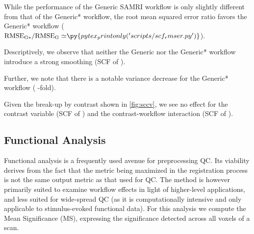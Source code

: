 While the performance of the Generic SAMRI workflow is only slightly different from that of the Generic* workflow, the root mean squared error ratio favors the Generic* workflow ($\mathrm{RMSE_{G*}/RMSE_{G}\simeq} \py{pytex_printonly('scripts/scf_rmser.py')}$).

Descriptively, we observe that neither the Generic nor the Generic* workflow introduce a strong smoothing (SCF of ).

Further, we note that there is a notable variance decrease for the Generic* workflow
(
-fold).

Given the break-up by contrast shown in \cref{fig:sccv}, we see no effect for the contrast variable
(SCF of )
and the contrast-workflow interaction
(SCF of ).

\subsection{Functional Analysis}

Functional analysis is a frequently used avenue for preprocessing QC.
Its viability derives from the fact that the metric being maximized in the registration process is not the same output metric as that used for QC.
The method is however primarily suited to examine workflow effects in light of higher-level applications, and less suited for wide-spread QC (as it is computationally intensive and only applicable to stimulus-evoked functional data).
For this analysis we compute the Mean Significance (MS), expressing the significance detected across all voxels of a scan.

